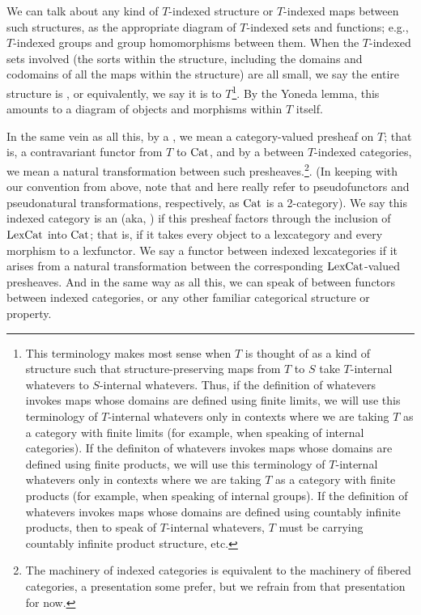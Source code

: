We can talk about any kind of $T$-indexed structure or $T$-indexed maps between such structures, as the appropriate diagram of $T$-indexed sets and functions; e.g., $T$-indexed groups and group homomorphisms between them. When the $T$-indexed sets involved (the sorts within the structure, including the domains and codomains of all the maps within the structure) are all small, we say the entire structure is , or equivalently, we say it is  to $T$\footnote{This  terminology makes most sense when $T$ is thought of as a kind of structure such that structure-preserving maps from $T$ to $S$ take $T$-internal whatevers to $S$-internal whatevers. Thus, if the definition of whatevers invokes maps whose domains are defined using finite limits, we will use this terminology of $T$-internal whatevers only in contexts where we are taking $T$ as a category with finite limits (for example, when speaking of internal categories). If the definiton of whatevers invokes maps whose domains are defined using finite products, we will use this terminology of $T$-internal whatevers only in contexts where we are taking $T$ as a category with finite products (for example, when speaking of internal groups). If the definition of whatevers invokes maps whose domains are defined using countably infinite products, then to speak of $T$-internal whatevers, $T$ must be carrying countably infinite product structure, etc.}. By the Yoneda lemma, this amounts to a diagram of objects and morphisms within $T$ itself.

In the same vein as all this, by a , we mean a category-valued presheaf on $T$; that is, a contravariant functor from $T$ to $\mathrm{Cat}$, and by a  between $T$-indexed categories, we mean a natural transformation between such presheaves.\footnote{The machinery of indexed categories is equivalent to the machinery of fibered categories, a presentation some prefer, but we refrain from that presentation for now.}. (In keeping with our convention from above, note that  and  here really refer to pseudofunctors and pseudonatural transformations, respectively, as $\mathrm{Cat}$ is a 2-category). We say this indexed category is an  (aka, ) if this presheaf factors through the inclusion of $\mathrm{LexCat}$ into $\mathrm{Cat}$; that is, if it takes every object to a lexcategory and every morphism to a lexfunctor. We say a functor between indexed lexcategories  if it arises from a natural transformation between the corresponding $\mathrm{LexCat}$-valued presheaves. And in the same way as all this, we can speak of  between functors between indexed categories, or any other familiar categorical structure or property.

